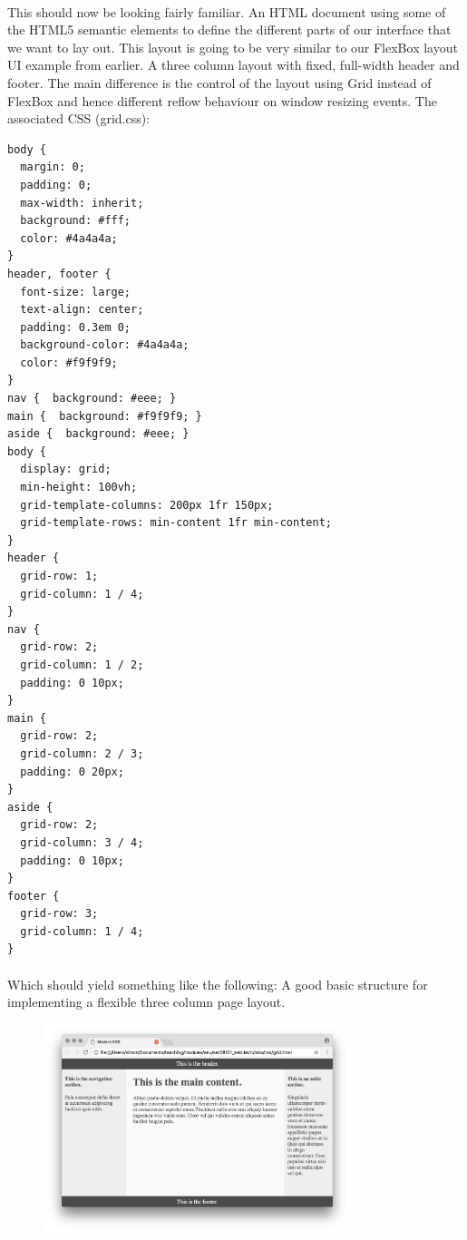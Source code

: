 \paragraph{} This should now be looking fairly familiar. An HTML document using some of the HTML5 semantic elements to define the different parts of our interface that we want to lay out. This layout is going to be very similar to our FlexBox layout UI example from earlier. A three column layout with fixed, full-width header and footer. The main difference is the control of the layout using Grid instead of FlexBox and hence different reflow behaviour on window resizing events. The associated CSS (grid.css):

\begin{lstlisting}
body {
  margin: 0;
  padding: 0;
  max-width: inherit;
  background: #fff;
  color: #4a4a4a;
}
header, footer {
  font-size: large;
  text-align: center;
  padding: 0.3em 0;
  background-color: #4a4a4a;
  color: #f9f9f9;
}
nav {  background: #eee; }
main {  background: #f9f9f9; }
aside {  background: #eee; }
body {
  display: grid;
  min-height: 100vh;
  grid-template-columns: 200px 1fr 150px;
  grid-template-rows: min-content 1fr min-content;
}
header {
  grid-row: 1;
  grid-column: 1 / 4;
}
nav {
  grid-row: 2;
  grid-column: 1 / 2;
  padding: 0 10px;
}
main {
  grid-row: 2;
  grid-column: 2 / 3;
  padding: 0 20px;
}
aside {
  grid-row: 2;
  grid-column: 3 / 4;
  padding: 0 10px;
}
footer {
  grid-row: 3;
  grid-column: 1 / 4;
}
\end{lstlisting}

\paragraph{} Which should yield something like the following: A good basic structure for implementing a flexible three column page layout.

\begin{figure}[H]
\centering
\includegraphics[width=0.8\textwidth]{figures/grid-ui}
\label{fig:grid-ui}
\caption{}
\end{figure}


